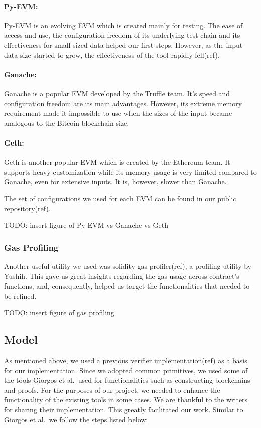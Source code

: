 \paragraph {Py-EVM:} Py-EVM is an evolving EVM which is created mainly for
testing. The ease of access and use, the configuration freedom of its
underlying test chain and its effectiveness for small sized data helped our
first steps. However, as the input data size started to grow, the effectiveness
of the tool rapidly fell(ref).

\paragraph {Ganache:} Ganache is a popular EVM developed by the Truffle team.
It’s speed and configuration freedom are its main advantages. However, its
extreme memory requirement made it impossible to use when the sizes of the
input became analogous to the Bitcoin blockchain size.

\paragraph {Geth:} Geth is another popular EVM which is created by the Ethereum
team. It supports heavy customization while its memory usage is very limited
compared to Ganache, even for extensive inputs. It is, however, slower than
Ganache.

The set of configurations we used for each EVM can be found in our
public repository(ref).

TODO: insert figure of Py-EVM vs Ganache vs Geth

\subsubsection{Gas Profiling}

Another useful utility we used was solidity-gas-profiler(ref), a profiling
utility by Yushih. This gave us great insights regarding the gas usage across
contract’s functions, and, consequently, helped us target the functionalities
that needed to be refined.

TODO: insert figure of gas profiling

\subsection{Model}

As mentioned above, we used a previous verifier implementation(ref) as
a basis for our implementation. Since we adopted common primitives, we
used some of the tools Giorgos et al.\ used for functionalities such as
constructing blockchains and proofs. For the purposes of our project,
we needed to enhance the functionality of the existing tools in some
cases. We are thankful to the writers for sharing their
implementation. This greatly facilitated our work. Similar to Giorgos
et al.\, we follow the steps listed below:


